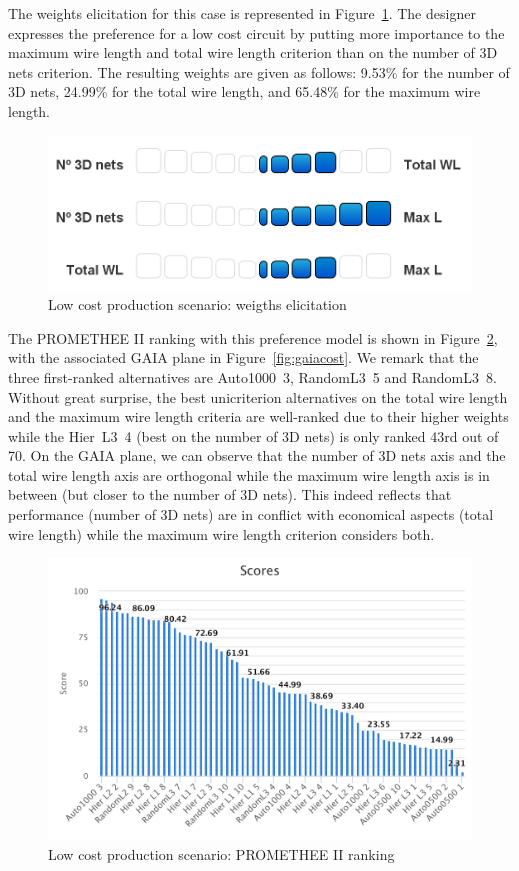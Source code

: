 \documentclass{svmult}
\begin{document}
The weights elicitation for this case is represented in Figure~\ref{fig:elicitcost}. The designer expresses the preference for a low cost circuit by putting more importance to the maximum wire length and total wire length criterion than on the number of 3D nets criterion. The resulting weights are given as follows: 9.53\% for the number of 3D nets, 24.99\% for the total wire length, and 65.48\% for the maximum wire length.

\begin{figure}[h!]
    \centering
    \includegraphics[width=0.6\linewidth]{elicitcost.png}
    \caption{Low cost production scenario: weigths elicitation}
    \label{fig:elicitcost}
\end{figure}

The PROMETHEE II ranking with this preference model is shown in Figure~\ref{fig:rankingcost}, with the associated GAIA plane in Figure~\ref{fig:gaiacost}. We remark that the three first-ranked alternatives are Auto1000~3, RandomL3~5 and RandomL3~8. Without great surprise, the best unicriterion alternatives on the total wire length and the maximum wire length criteria are well-ranked due to their higher weights while the Hier~L3~4 (best on the number of 3D nets) is only ranked 43rd out of 70. On the GAIA plane, we can observe that the number of 3D nets axis and the total wire length axis are orthogonal while the maximum wire length axis is in between (but closer to the number of 3D nets). This indeed reflects that performance (number of 3D nets) are in conflict with economical aspects (total wire length) while the maximum wire length criterion considers both.

\begin{figure}[h!]
    \centering
    \includegraphics[width=\linewidth]{rankingcost}
    \caption{Low cost production scenario: PROMETHEE II ranking}
    \label{fig:rankingcost}
\end{figure}
\end{document}
